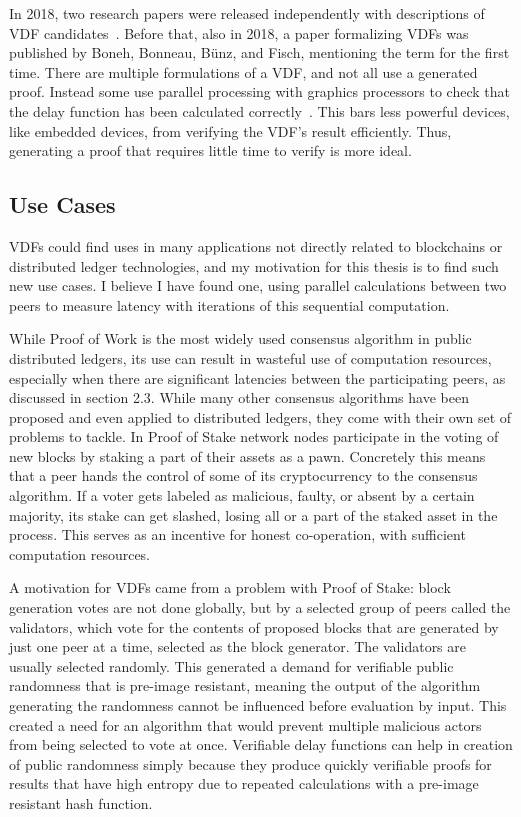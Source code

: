 In 2018, two research papers were released independently with descriptions of VDF candidates~\cite{Wesolowski2018-rf, Pietrzak2018-xs}. Before that, also in 2018, a paper formalizing VDFs was published by Boneh, Bonneau, Bünz, and Fisch, mentioning the term for the first time. There are multiple formulations of a VDF, and not all use a generated proof. Instead some use parallel processing with graphics processors to check that the delay function has been calculated correctly~\cite{Yakovenko2018-zn}. This bars less powerful devices, like embedded devices, from verifying the VDF's result efficiently. Thus, generating a proof that requires little time to verify is more ideal.~\cite{Boneh_undated-ml}

\subsection{Use Cases}
VDFs could find uses in many applications not directly related to blockchains or distributed ledger technologies, and my motivation for this thesis is to find such new use cases. I believe I have found one, using parallel calculations between two peers to measure latency with iterations of this sequential computation.

While Proof of Work is the most widely used consensus algorithm in public distributed ledgers, its use can result in wasteful use of computation resources, especially when there are significant latencies between the participating peers, as discussed in section 2.3. While many other consensus algorithms have been proposed and even applied to distributed ledgers, they come with their own set of problems to tackle. In Proof of Stake network nodes participate in the voting of new blocks by staking a part of their assets as a pawn. Concretely this means that a peer hands the control of some of its cryptocurrency to the consensus algorithm. If a voter gets labeled as malicious, faulty, or absent by a certain majority, its stake can get slashed, losing all or a part of the staked asset in the process. This serves as an incentive for honest co-operation, with sufficient computation resources.

A motivation for VDFs came from a problem with Proof of Stake: block generation votes are not done globally, but by a selected group of peers called the validators, which vote for the contents of proposed blocks that are generated by just one peer at a time, selected as the block generator. The validators are usually selected randomly. This generated a demand for verifiable public randomness that is pre-image resistant, meaning the output of the algorithm generating the randomness cannot be influenced before evaluation by input. This created a need for an algorithm that would prevent multiple malicious actors from being selected to vote at once. Verifiable delay functions can help in creation of public randomness simply because they produce quickly verifiable proofs for results that have high entropy due to repeated calculations with a pre-image resistant hash function.

